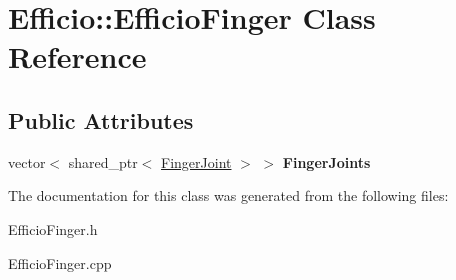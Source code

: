 \hypertarget{class_efficio_1_1_efficio_finger}{}\section{Efficio\+:\+:Efficio\+Finger Class Reference}
\label{class_efficio_1_1_efficio_finger}
\subsection*{Public Attributes}
\begin{DoxyCompactItemize}
\item 
\hypertarget{class_efficio_1_1_efficio_finger_a94c33d41eaabccdd5e4631b4f8970032}{}\label{class_efficio_1_1_efficio_finger_a94c33d41eaabccdd5e4631b4f8970032} 
vector$<$ shared\+\_\+ptr$<$ \hyperlink{class_efficio_1_1_finger_joint}{Finger\+Joint} $>$ $>$ {\bfseries Finger\+Joints}
\end{DoxyCompactItemize}


The documentation for this class was generated from the following files\+:\begin{DoxyCompactItemize}
\item 
Efficio\+Finger.\+h\item 
Efficio\+Finger.\+cpp\end{DoxyCompactItemize}
